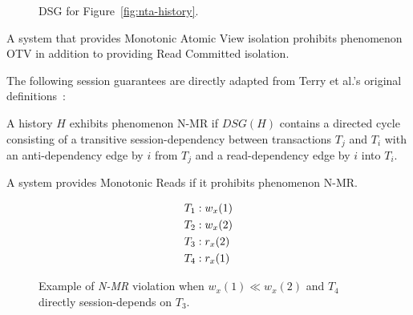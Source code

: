 \begin{figure}[H]
\centering
{}
\caption{DSG for Figure~\ref{fig:nta-history}.}
\label{fig:nta-dsg}
\end{figure}

\begin{definition}
A system that provides Monotonic Atomic View isolation prohibits
phenomenon OTV in addition to providing Read Committed isolation.
\end{definition}

The following session guarantees are directly adapted from Terry et
al.'s original definitions~\cite{sessionguarantees}:

\begin{definition}
A history $H$ exhibits phenomenon N-MR if $DSG(H)$ contains a directed cycle
consisting of a transitive session-dependency between transactions
$T_j$ and $T_i$ with an anti-dependency edge by $i$ from $T_j$ and a
read-dependency edge by $i$ into $T_i$.
\end{definition}

\begin{definition}
A system provides Monotonic Reads if it prohibits phenomenon N-MR.
\end{definition}


\begin{figure}[H]
\begin{align*}
\small
T_1 &: w_x(1)\\
T_2 &: w_x(2)\\
T_3 &: r_x(2)\\
T_4 &: r_x(1)
\end{align*}
\caption{Example of \textit{N-MR} violation when $w_x(1) \ll w_x(2)$ and $T_4$ directly session-depends on $T_3$.}
\label{fig:nmr-history}
\end{figure}

